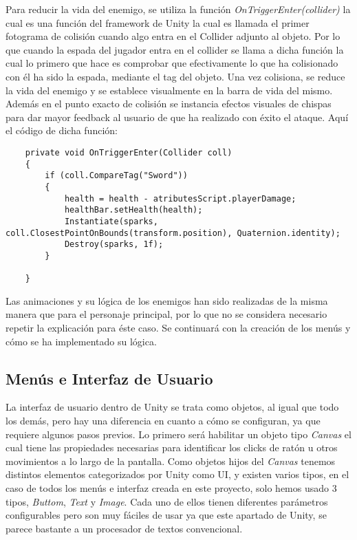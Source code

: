Para reducir la vida del enemigo, se utiliza la función \textit{OnTriggerEnter(collider)} la cual es una función del framework de Unity la cual es llamada el primer fotograma de colisión cuando algo entra en el Collider adjunto al objeto. Por lo que cuando la espada del jugador entra en el collider se llama a dicha función la cual lo primero que hace es comprobar que efectivamente lo que ha colisionado con él ha sido la espada, mediante el tag del objeto. Una vez colisiona, se reduce la vida del enemigo y se establece visualmente en la barra de vida del mismo. Además en el punto exacto de colisión se instancia efectos visuales de chispas para dar mayor feedback al usuario de que ha realizado con éxito el ataque. Aquí el código de dicha función: 

\begin{lstlisting}
    private void OnTriggerEnter(Collider coll)
    {
        if (coll.CompareTag("Sword"))
        {
            health = health - atributesScript.playerDamage;
            healthBar.setHealth(health);
            Instantiate(sparks, coll.ClosestPointOnBounds(transform.position), Quaternion.identity);
            Destroy(sparks, 1f);
        }

    }
\end{lstlisting}

Las animaciones y su lógica de los enemigos han sido realizadas de la misma manera que para el personaje principal, por lo que no se considera necesario repetir la explicación para éste caso. Se continuará con la creación de los menús y cómo se ha implementado su lógica.

\subsection{Menús e Interfaz de Usuario}

La interfaz de usuario dentro de Unity se trata como objetos, al igual que todo los demás, pero hay una diferencia en cuanto a cómo se configuran, ya que requiere algunos pasos previos. Lo primero será habilitar un objeto tipo \textit{Canvas} el cual tiene las propiedades necesarias para identificar los clicks de ratón u otros movimientos a lo largo de la pantalla. Como objetos hijos del \textit{Canvas} tenemos distintos elementos categorizados por Unity como UI, y existen varios tipos, en el caso de todos los menús e interfaz creada en este proyecto, solo hemos usado 3 tipos, \textit{Buttom}, \textit{Text} y \textit{Image}. Cada uno de ellos tienen diferentes parámetros configurables pero son muy fáciles de usar ya que este apartado de Unity, se parece bastante a un procesador de textos convencional.

